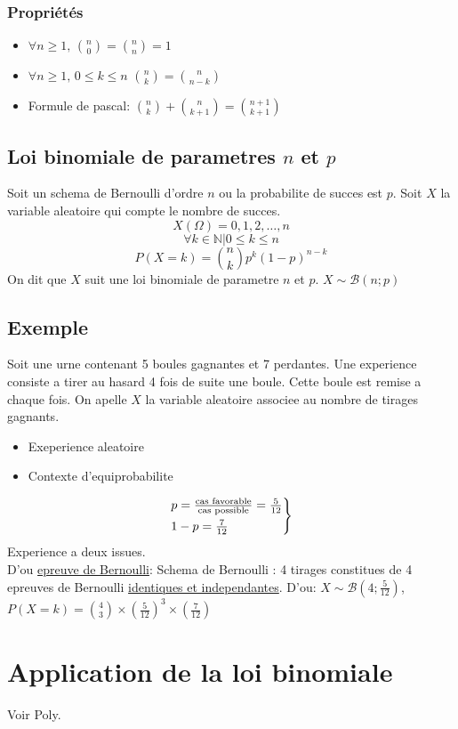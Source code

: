\documentclass{article}
\begin{document}
\subsubsection*{Propriétés}
\begin{itemize}
	\item $\forall n \geq 1,\, \binom{n}{0} = \binom{n}{n} = 1$
	\item $\forall n \geq 1,\, 0\leq k \leq n$ \quad $\binom{n}{k}=\binom{n}{n-k}$
	\item Formule de pascal: $\binom{n}{k} + \binom{n}{k+1} = \binom{n+1}{k+1}$
\end{itemize}
\subsection{Loi binomiale de parametres $n$ et $p$}

\begin{defbox}
	\sloppy
	Soit un schema de Bernoulli d'ordre $n$ ou la probabilite de succes est $p$. Soit $X$ la variable aleatoire qui compte le nombre de succes.
	$$X(\Omega) = {0,1,2,\dots, n}$$
	$$\forall k \in \mathbb{N} | 0 \leq k \leq n$$
	$$P(X=k) = \binom{n}{k}p^k(1-p)^{n-k}$$
	On dit que $X$ suit une loi binomiale de parametre $n$ et $p$.
	$ X \sim \mathscr{B}(n;p) $
\end{defbox}
\subsection{Exemple}
Soit une urne contenant 5 boules gagnantes et 7 perdantes. Une experience consiste a tirer au hasard 4 fois de suite une boule. Cette boule est remise a chaque fois. On apelle $X$ la variable aleatoire associee au nombre de tirages gagnants.

\begin{itemize}
	\item Exeperience aleatoire
	\item Contexte d'equiprobabilite
\end{itemize}
$$
\begin{rcases}
	p = \frac{\text{cas favorable}}{\text{cas possible}} = \frac{5}{12}\\
	1-p = \frac{7}{12}
\end{rcases}
$$ Experience a deux issues.\\
D'ou \underline{epreuve de Bernoulli}: 
Schema de Bernoulli : 4 tirages constitues de 4 epreuves de Bernoulli \underline{identiques et independantes}.
D'ou: $X \sim \mathscr{B}(4;\frac{5}{12})$, $P(X=k) = \binom{4}{3}\times (\frac{5}{12})^3 \times (\frac{7}{12})$
\section{Application de la loi binomiale}

Voir Poly. 
\end{document}
